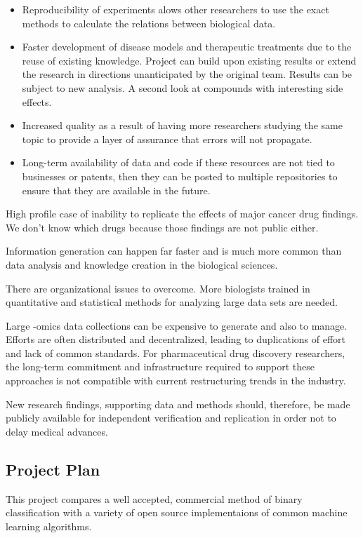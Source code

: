 \begin{itemize}

\item Reproducibility of experiments alows other researchers to use the exact methods to calculate the relations between biological data.

\item Faster development of disease models and therapeutic treatments due to the reuse of existing knowledge. Project can build upon existing results or extend the research in directions unanticipated by the original team. Results can be subject to new analysis. A second look at compounds with interesting side effects.

\item Increased quality as a result of having more researchers studying the same topic to provide a layer of assurance that errors will not propagate.

\item Long-term availability of data and code if these resources are not tied to businesses or patents, then they can be posted to multiple repositories to ensure that they are available in the future.
\cite{Prlic2012}

\end{itemize}

High profile case of inability to replicate the effects of major cancer drug findings. \cite{} We don't know which drugs because those findings are not public either.

Information generation can happen far faster and is much more common than data analysis and knowledge creation in the biological sciences.

There are organizational issues to overcome. More biologists trained in quantitative and statistical methods for analyzing large data sets are needed. 

Large -omics data collections can be expensive to generate and also to manage. Efforts are often distributed and decentralized, leading to duplications of effort and lack of common standards. For pharmaceutical drug discovery researchers, the long-term commitment and infrastructure required to support these approaches is not compatible with current restructuring trends in the industry.\cite{Berg2014}

New research findings, supporting data and methods should, therefore, be made publicly available for independent verification and replication in order not to delay medical advances.


\subsection{Project Plan}
This project compares a well accepted, commercial method of binary classification with a variety of open source implementaions of common machine learning algorithms.

